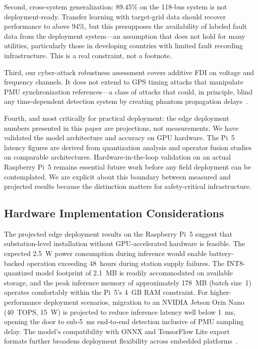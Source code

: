 \documentclass[journal]{IEEEtran}
\begin{document}
Second, cross-system generalization: 89.45\% on the 118-bus system is not deployment-ready. Transfer learning with target-grid data should recover performance to above 94\%, but this presupposes the availability of labeled fault data from the deployment system---an assumption that does not hold for many utilities, particularly those in developing countries with limited fault recording infrastructure. This is a real constraint, not a footnote.

Third, our cyber-attack robustness assessment covers additive FDI on voltage and frequency channels. It does not extend to GPS timing attacks that manipulate PMU synchronization references---a class of attacks that could, in principle, blind any time-dependent detection system by creating phantom propagation delays~\cite{ref13}.

Fourth, and most critically for practical deployment: the edge deployment numbers presented in this paper are projections, not measurements. We have validated the model architecture and accuracy on GPU hardware. The Pi~5 latency figures are derived from quantization analysis and operator fusion studies on comparable architectures. Hardware-in-the-loop validation on an actual Raspberry Pi~5 remains essential future work before any field deployment can be contemplated. We are explicit about this boundary between measured and projected results because the distinction matters for safety-critical infrastructure.

\subsection{Hardware Implementation Considerations}

The projected edge deployment results on the Raspberry Pi~5 suggest that substation-level installation without GPU-accelerated hardware is feasible. The expected 2.5~W power consumption during inference would enable battery-backed operation exceeding 48~hours during station supply failures. The INT8-quantized model footprint of 2.1~MB is readily accommodated on available storage, and the peak inference memory of approximately 178~MB (batch size~1) operates comfortably within the Pi~5's 4~GB RAM constraint. For higher-performance deployment scenarios, migration to an NVIDIA Jetson Orin Nano (40~TOPS, 15~W) is projected to reduce inference latency well below 1~ms, opening the door to sub-5~ms end-to-end detection inclusive of PMU sampling delay. The model's compatibility with ONNX and TensorFlow Lite export formats further broadens deployment flexibility across embedded platforms~\cite{ref29,ref30}.
\end{document}
